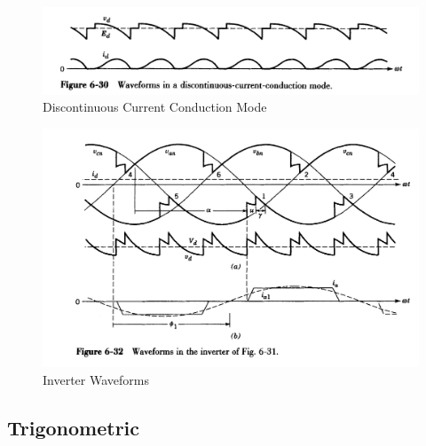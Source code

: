 \documentclass[twocolumn, ]{article}
\begin{document}
\begin{itemize}
\begin{figure}[!ht]
	\includegraphics[scale=0.27]{dcm.png}
	\caption{Discontinuous Current Conduction Mode}
\end{figure}

\begin{figure}[!ht]
	\includegraphics[scale=0.25]{inverter.png}
	\caption{Inverter Waveforms}
\end{figure}


\end{itemize}

\subsection*{  Trigonometric }
\end{document}
